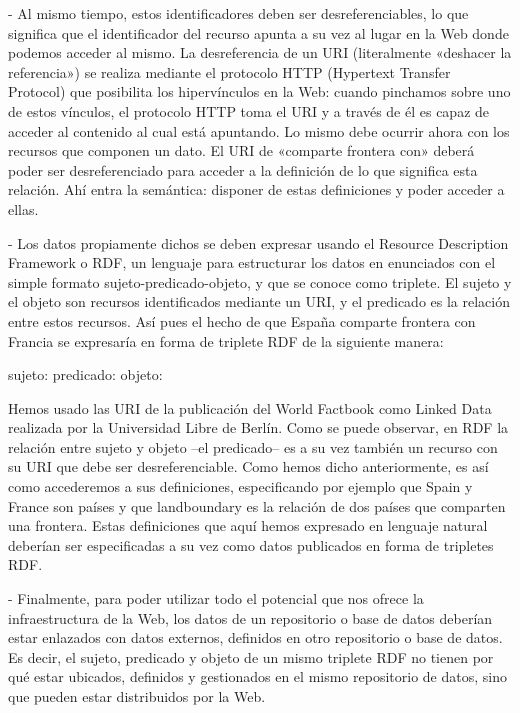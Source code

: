 - Al mismo tiempo, estos identificadores deben ser desreferenciables, lo que significa que el identificador del recurso apunta a su vez al lugar en la Web donde podemos acceder al mismo. La desreferencia de un URI (literalmente «deshacer la referencia») se realiza mediante el protocolo HTTP (Hypertext Transfer Protocol) que posibilita los hipervínculos en la Web: cuando pinchamos sobre uno de estos vínculos, el protocolo HTTP toma el URI y a través de él es capaz de acceder al contenido al cual está apuntando. Lo mismo debe ocurrir ahora con los recursos que componen un dato. El URI de «comparte frontera con» deberá poder ser desreferenciado para acceder a la definición de lo que significa esta relación. Ahí entra la semántica: disponer de estas definiciones y poder acceder a ellas.

- Los datos propiamente dichos se deben expresar usando el Resource Description Framework o RDF, un lenguaje para estructurar los datos en enunciados con el simple formato sujeto-predicado-objeto, y que se conoce como triplete. El sujeto y el objeto son recursos identificados mediante un URI, y el predicado es la relación entre estos recursos. Así pues el hecho de que España comparte frontera con Francia se expresaría en forma de triplete RDF de la siguiente manera:

sujeto: %
predicado: %
objeto: %

Hemos usado las URI de la publicación del World Factbook como Linked Data realizada por la Universidad Libre de Berlín. Como se puede observar, en RDF la relación entre sujeto y objeto –el predicado– es a su vez también un recurso con su URI que debe ser desreferenciable. Como hemos dicho anteriormente, es así como accederemos a sus definiciones, especificando por ejemplo que Spain y France son países y que landboundary es la relación de dos países que comparten una frontera. Estas definiciones que aquí hemos expresado en lenguaje natural deberían ser especificadas a su vez como datos publicados en forma de tripletes RDF.

- Finalmente, para poder utilizar todo el potencial que nos ofrece la infraestructura de la Web, los datos de un repositorio o base de datos deberían estar enlazados con datos externos, definidos en otro repositorio o base de datos. Es decir, el sujeto, predicado y objeto de un mismo triplete RDF no tienen por qué estar ubicados, definidos y gestionados en el mismo repositorio de datos, sino que pueden estar distribuidos por la Web.

